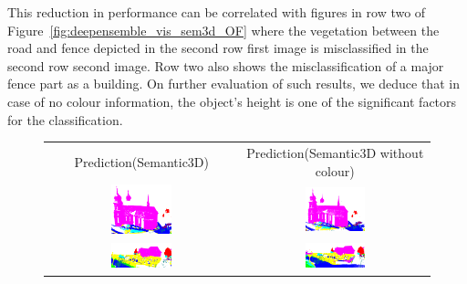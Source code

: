     This reduction in performance can be correlated with figures in row two of Figure~\ref{fig:deepensemble_vis_sem3d_OF} where the vegetation between the road and fence depicted in the second row first image is misclassified in the second row second image.
    Row two also shows the misclassification of a major fence part as a building.
    On further evaluation of such results, we deduce that in case of no colour information, the object's height is one of the significant factors for the classification.
    \begin{figure}[h!]
        \centering
        \begin{tabular}{cc}
            Prediction(Semantic3D) & Prediction(Semantic3D without colour)\\
            \includegraphics[width=0.33\textwidth, height=0.175\textheight]{images/ood_imgs/de_sem3d/de_class_prob_1.pdf}&
            \includegraphics[width=0.33\textwidth, height=0.175\textheight]{images/sem3d_of/de_sem3d_of_1.pdf}\\

            \includegraphics[width=0.33\textwidth, height=0.175\textheight]{images/ood_imgs/de_sem3d/de_class_prob_2.pdf}&
            \includegraphics[width=0.33\textwidth, height=0.175\textheight]{images/sem3d_of/de_sem3d_of_2.pdf}\\


\end{tabular}
\end{figure}
